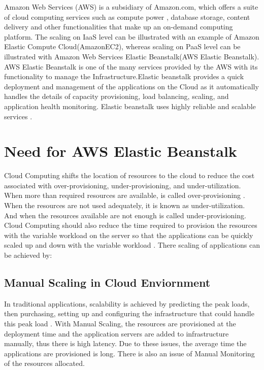 \documentclass[9pt,twocolumn,twoside]{../../styles/osajnl}
\begin{document}
Amazon Web Services (AWS) is a subsidiary of Amazon.com, which offers
a suite of cloud computing services such as compute power \TE,
database storage, content delivery and other functionalities that make
up an on-demand computing platform. The scaling on IaaS level can be
illustrated with an example of Amazon Elastic Compute
Cloud(AmazonEC2), whereas scaling on PaaS level can be illustrated
with Amazon Web Services Elastic Beanstalk(AWS Elastic
Beanstalk).  AWS Elastic Beanstalk is one of
the many services provided by the AWS with its functionality to manage
the Infrastructure.Elastic beanstalk provides a quick deployment and
management of the applications on the Cloud as it automatically
handles the details of capacity provisioning, load balancing, scaling,
and application health monitoring. Elastic beanstalk uses highly
reliable and scalable services \cite{elastic-beanstalk-2}.

\section{Need for AWS Elastic Beanstalk}

Cloud Computing shifts the location of resources to the cloud to
reduce the cost associated with over-provisioning, under-provisioning,
and under-utilization. When more than required resources are
available, is called over-provisioning \cite{cloudcomputing}. When the
resources are not used adequately, it is known as
under-utilization. And \GE when the resources available are not enough is
called under-provisioning. Cloud Computing should also reduce the time
required to provision the resources with the variable workload on the
server so that the applications can be quickly scaled up and down with
the variable workload \cite{elastic-beanstalk-book}. There scaling of
applications can be achieved by:


\subsection{Manual Scaling in Cloud Enviornment}

In traditional applications, scalability is achieved by predicting the
peak loads, then purchasing, setting up and configuring the
infrastructure that could handle this peak load \cite{ManualScaling}. With Manual
Scaling, the resources are provisioned at the deployment time and the
application servers are added to infrastructure manually, thus there is
high latency. Due to these issues, the average time the applications
are provisioned is long. There is also an issue of Manual
Monitoring of the resources allocated.
\end{document}
